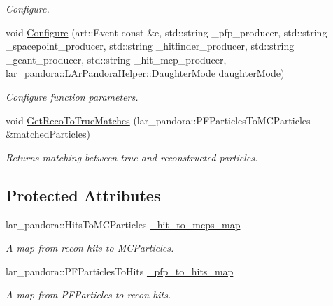\begin{DoxyCompactItemize}
\begin{DoxyCompactList}\small\item\em Configure. \end{DoxyCompactList}\item 
void \hyperlink{classubana_1_1McPfpMatch_af0f60c86d087ee5c99a73170cf03b200}{Configure} (art\-::\-Event const \&e, std\-::string \-\_\-pfp\-\_\-producer, std\-::string \-\_\-spacepoint\-\_\-producer, std\-::string \-\_\-hitfinder\-\_\-producer, std\-::string \-\_\-geant\-\_\-producer, std\-::string \-\_\-hit\-\_\-mcp\-\_\-producer, lar\-\_\-pandora\-::\-L\-Ar\-Pandora\-Helper\-::\-Daughter\-Mode daughter\-Mode)
\begin{DoxyCompactList}\small\item\em Configure function parameters. \end{DoxyCompactList}\item 
void \hyperlink{classubana_1_1McPfpMatch_a44436a82315246fb67b42f8542fb327c}{Get\-Reco\-To\-True\-Matches} (lar\-\_\-pandora\-::\-P\-F\-Particles\-To\-M\-C\-Particles \&matched\-Particles)
\begin{DoxyCompactList}\small\item\em Returns matching between true and reconstructed particles. \end{DoxyCompactList}\end{DoxyCompactItemize}
\subsection*{Protected Attributes}
\begin{DoxyCompactItemize}
\item 
\hypertarget{classubana_1_1McPfpMatch_a25cfffd776380532cc69cae6c9c9b321}{lar\-\_\-pandora\-::\-Hits\-To\-M\-C\-Particles \hyperlink{classubana_1_1McPfpMatch_a25cfffd776380532cc69cae6c9c9b321}{\-\_\-hit\-\_\-to\-\_\-mcps\-\_\-map}}\label{classubana_1_1McPfpMatch_a25cfffd776380532cc69cae6c9c9b321}

\begin{DoxyCompactList}\small\item\em A map from recon hits to M\-C\-Particles. \end{DoxyCompactList}\item 
\hypertarget{classubana_1_1McPfpMatch_a5906c7bb3e976375cdbb7c281aa869e3}{lar\-\_\-pandora\-::\-P\-F\-Particles\-To\-Hits \hyperlink{classubana_1_1McPfpMatch_a5906c7bb3e976375cdbb7c281aa869e3}{\-\_\-pfp\-\_\-to\-\_\-hits\-\_\-map}}\label{classubana_1_1McPfpMatch_a5906c7bb3e976375cdbb7c281aa869e3}

\begin{DoxyCompactList}\small\item\em A map from P\-F\-Particles to recon hits. \end{DoxyCompactList}\end{DoxyCompactItemize}


